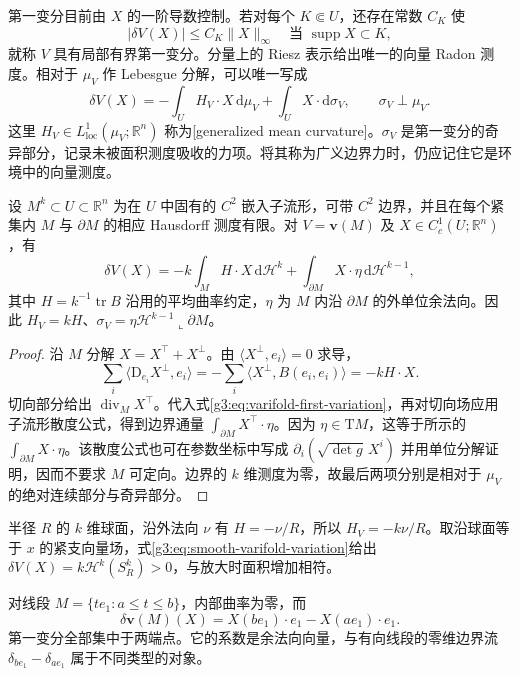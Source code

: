 第一变分目前由 \(X\) 的一阶导数控制。若对每个 \(K\Subset U\)，还存在常数 \(C_K\) 使
\[
	|\delta V(X)|\le C_K\|X\|_\infty
	\quad\text{当 }\operatorname{supp}X\subset K,
\]
就称 \(V\) 具有局部有界第一变分。分量上的 Riesz 表示给出唯一的向量 Radon 测度。相对于 \(\mu_V\) 作 Lebesgue 分解，可以唯一写成
\begin{equation}\label{g3:eq:varifold-mean-curvature-decomposition}
	\delta V(X)=-\int_U H_V\cdot X\,\mathrm d\mu_V+\int_U X\cdot\mathrm d\sigma_V,
	\qquad \sigma_V\perp\mu_V.
\end{equation}
这里 \(H_V\in L^1_{\mathrm{loc}}(\mu_V;\mathbb R^n)\) 称为[generalized mean curvature]。\(\sigma_V\) 是第一变分的奇异部分，记录未被面积测度吸收的力项。将其称为广义边界力时，仍应记住它是环境中的向量测度。

\begin{proposition}\label{g3:prop:smooth-varifold-boundary-variation}
	设 \(M^k\subset U\subset\mathbb R^n\) 为在 \(U\) 中固有的 \(C^2\) 嵌入子流形，可带 \(C^2\) 边界，并且在每个紧集内 \(M\) 与 \(\partial M\) 的相应 Hausdorff 测度有限。对 \(V=\mathbf v(M)\) 及 \(X\in C_c^1(U;\mathbb R^n)\)，有
	\begin{equation}\label{g3:eq:smooth-varifold-variation}
		\delta V(X)=-k\int_M H\cdot X\,\mathrm d\mathcal H^k
		+\int_{\partial M}X\cdot\eta\,\mathrm d\mathcal H^{k-1},
	\end{equation}
	其中 \(H=k^{-1}\operatorname{tr}B\) 沿用的平均曲率约定，\(\eta\) 为 \(M\) 内沿 \(\partial M\) 的外单位余法向。因此 \(H_V=kH\)、\(\sigma_V=\eta\mathcal H^{k-1}\llcorner\partial M\)。
\end{proposition}
\begin{proof}
	沿 \(M\) 分解 \(X=X^\top+X^\perp\)。由 \(\langle X^\perp,e_i\rangle=0\) 求导，
	\[
		\sum_i\langle\mathrm D_{e_i}X^\perp,e_i\rangle
		=-\sum_i\langle X^\perp,B(e_i,e_i)\rangle=-kH\cdot X.
	\]
	切向部分给出 \(\operatorname{div}_M X^\top\)。代入式\eqref{g3:eq:varifold-first-variation}，再对切向场应用子流形散度公式，得到边界通量 \(\int_{\partial M}X^\top\cdot\eta\)。因为 \(\eta\in\mathrm{T}M\)，这等于所示的 \(\int_{\partial M}X\cdot\eta\)。该散度公式也可在参数坐标中写成 \(\partial_i(\sqrt{\det g}\,X^i)\) 并用单位分解证明，因而不要求 \(M\) 可定向。边界的 \(k\) 维测度为零，故最后两项分别是相对于 \(\mu_V\) 的绝对连续部分与奇异部分。
\end{proof}

\begin{example}\label{g3:exm:varifold-sphere-and-segment}
	半径 \(R\) 的 \(k\) 维球面，沿外法向 \(\nu\) 有 \(H=-\nu/R\)，所以 \(H_V=-k\nu/R\)。取沿球面等于 \(x\) 的紧支向量场，式\eqref{g3:eq:smooth-varifold-variation}给出 \(\delta V(X)=k\mathcal H^k(S_R^k)>0\)，与放大时面积增加相符。

	对线段 \(M=\{te_1:a\le t\le b\}\)，内部曲率为零，而
	\[
		\delta\mathbf v(M)(X)=X(be_1)\cdot e_1-X(ae_1)\cdot e_1.
	\]
	第一变分全部集中于两端点。它的系数是余法向向量，与有向线段的零维边界流 \(\delta_{be_1}-\delta_{ae_1}\) 属于不同类型的对象。
\end{example}


